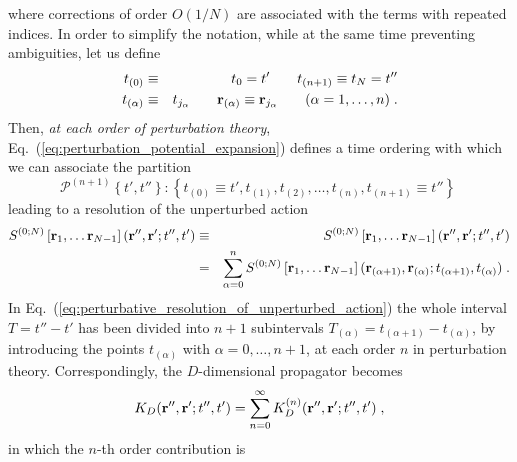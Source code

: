 \documentclass[a4paper,preprint,draft,showpacs,amsmath,amsfonts,amssymb,aps,prd]{revtex4}%
\begin{document}
where corrections of order 
$ O \left( 1/N \right) $ are associated with the terms
with repeated indices.
In order to simplify the notation, while at the same time preventing ambiguities,
let us define
\begin{eqnarray}
t_{(0)}
& \equiv &
t_{0}
=
t'
\; \; \; \; \; \; \; 
t_{(n+1)}
\equiv 
t_{N}
=
t''
\nonumber \\
t_{(\alpha)}
& \equiv &
t_{j_{\alpha}}
\; \; \; \; \; \; \; 
{\bf r}_{(\alpha)}
\equiv 
{\bf r}_{j_{\alpha}}
\; \; \; \; \; \; \; 
(\alpha = 1, \dots , n)
\;  .
\end{eqnarray}
Then, {\em at each order of perturbation theory\/},
Eq.~(\ref{eq:perturbation_potential_expansion}) defines a time ordering
with which we can associate the partition
\begin{equation}
{\mathcal P}^{(n+1)} 
\left\{
t',t''
\right\}
:
\left\{
t_{(0)} \equiv t', 
t_{(1)},
t_{(2)},
\ldots
,
t_{(n)},
t_{(n+1)} \equiv t''
\right\}
\;  
\label{eq:time_interval_partition}
\end{equation}
leading to a resolution of the unperturbed action
\begin{eqnarray}
S^{(0;N)}   
 \left[ 
{\bf r}_{1},
\dots
{\bf r}_{N-1}
\right]  ({\bf r}'', {\bf r}' ; t'',t')  
& \equiv &
S^{(0;N)}   
 \left[ 
{\bf r}_{1},
\dots
{\bf r}_{N-1}
\right]  ({\bf r}'', {\bf r}' ; t'',t')  
\nonumber \\
& = &
\sum_{\alpha=0}^{n}
S^{(0;N)}   
 \left[ 
{\bf r}_{1},
\dots
{\bf r}_{N-1}
\right]  ({\bf r}_{(\alpha+1)}, {\bf r}_{(\alpha)} ; t_{(\alpha+1)},t_{(\alpha)} )  
\;  .
\label{eq:perturbative_resolution_of_unperturbed_action}
\end{eqnarray}
In Eq.~(\ref{eq:perturbative_resolution_of_unperturbed_action})
the whole interval $T=t''-t'$ has been divided into
$n+1$ subintervals
 $T_{(\alpha)}=
t_{(\alpha+1)}- t_{(\alpha)}$,
by introducing the points $t_{(\alpha)}$ with $\alpha=0, \ldots, n+1$,
at each order $n$ in perturbation theory.
Correspondingly,
the $D$-dimensional propagator becomes
\begin{equation}
K_{D}({\bf r}'', {\bf r}' ; t'',t')
= 
\sum_{n=0}^{\infty}
K^{(n)}_{D}({\bf r}'', {\bf r}' ; t'',t')
\; ,
\label{eq:propagator_perturb_expansion}
\end{equation}
in which
the $n$-th order contribution is
\end{document}
